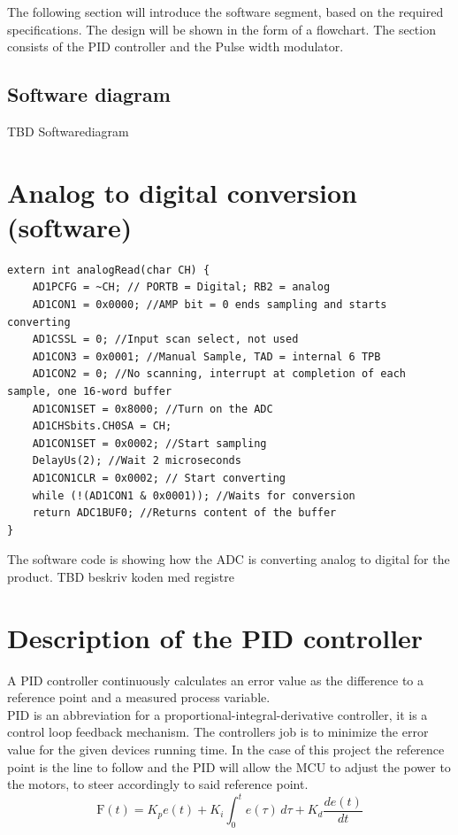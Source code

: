 
The following section will introduce the software segment, based on the required specifications. The design will be shown in the form of a flowchart.
The section consists of the PID controller and the Pulse width modulator.

\subsection{Software diagram}
TBD Softwarediagram

\section{Analog to digital conversion (software)}

\begin{lstlisting}
extern int analogRead(char CH) {
    AD1PCFG = ~CH; // PORTB = Digital; RB2 = analog
    AD1CON1 = 0x0000; //AMP bit = 0 ends sampling and starts converting
    AD1CSSL = 0; //Input scan select, not used
    AD1CON3 = 0x0001; //Manual Sample, TAD = internal 6 TPB
    AD1CON2 = 0; //No scanning, interrupt at completion of each sample, one 16-word buffer
    AD1CON1SET = 0x8000; //Turn on the ADC
    AD1CHSbits.CH0SA = CH;
    AD1CON1SET = 0x0002; //Start sampling
    DelayUs(2); //Wait 2 microseconds
    AD1CON1CLR = 0x0002; // Start converting
    while (!(AD1CON1 & 0x0001)); //Waits for conversion
    return ADC1BUF0; //Returns content of the buffer	
}
\end{lstlisting}
The software code is showing how the ADC is converting analog to digital for the product. TBD beskriv koden med registre

\newpage

\section {Description of the PID controller} 
A PID controller continuously calculates an error value as the difference to a reference point and a measured process variable.\\
PID is an abbreviation for a proportional-integral-derivative controller, it is a control loop feedback mechanism. The controllers job is to minimize the error value for the given devices running time. In the case of this project the reference point is the line to follow and the PID will allow the MCU to adjust the power to the motors, to steer accordingly to said reference point.
$$\mathrm{F}(t)=K_p{e(t)} + K_{i}\int_{0}^{t}{e(\tau)}\,{d\tau} + K_{d}\frac{de(t)}{dt}$$

